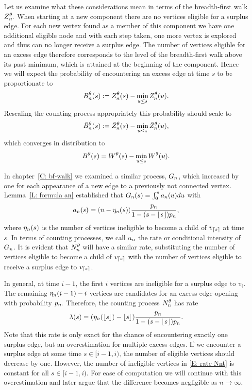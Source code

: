 Let us examine what these considerations mean in terms of the breadth-first walk $Z_n^{\theta}$.
When starting at a new component there are no vertices eligible for a surplus edge.
For each new vertex found as a member of this component we have one additional eligible node 
and with each step taken, one more vertex is explored and thus can no longer receive a surplus edge.
The number of vertices eligible for an excess edge therefore corresponds to the level of the breadth-first walk above its past minimum,
which is attained at the beginning of the component.
Hence we will expect the probability of encountering an excess edge at time $s$ to be proportionate to
\begin{equation} \label{D: zminz}
B_n^{\theta}(s) := Z_n^{\theta}(s) - \min_{u \leq s}Z_n^{\theta}(u).
\end{equation}
Rescaling the counting process appropriately this probability should scale to
\begin{equation}
\bar{B}_n^{\theta}(s) := \bar{Z}^{\theta}_n(s) - \min_{u \leq s}\bar{Z}^{\theta}_n(u),
\end{equation}
which converges in distribution to
\begin{equation*}
B^{\theta}(s) = W^{\theta}(s) - \min_{u \leq s}W^{\theta}(u). 
\end{equation*}

In chapter~\ref{C: bf-walk} we examined a similar process, $G_n$, 
which increased by one for each appearance of a new edge to a previously not connected vertex.
Lemma~\ref{L: formula an} established that $G_n(s) = \int_{0}^{s} a_n(u)du$ with
\begin{equation*}
	a_n(s) = (n - \eta_n(s)) \frac{p_n}{1-(s-\lfloor s\rfloor)p_n},
\end{equation*}
where $\eta_n(s)$ is the number of vertices ineligible to become a child of $v_{\lceil s\rceil}$ at time $s$.
In terms of counting processes, we call $a_n$ the rate or conditional intensity of $G_n$.
It is evident that $N_n^{\theta}$ will have a similar rate,
substituting the number of vertices eligible to become a child of $v_{\lceil s\rceil}$ with the number of vertices eligible to receive a surplus edge to $v_{\lceil s\rceil}$.

In general, at time $i-1$, the first $i$ vertices are ineligible for a surplus edge to $v_i$.
The remaining $\eta_n(i-1) - i$ vertices are candidates for an excess edge opening with probability $p_n$.
Therefore, the counting process $N_n^{\theta}$ has rate
\begin{equation} \label{E: rate Nnt}
\lambda(s) = (\eta_n(\lfloor s\rfloor) - \lfloor s\rfloor) \frac{p_n}{1-(s-\lfloor s\rfloor)p_n}.
\end{equation}
Note that this rate is only exact for the chance of encountering exactly one surplus edge, 
but an overestimation for multiple excess edges.
If we encounter a surplus edge at some time $s \in [i-1, i)$,
the number of eligible vertices should decrease by one.
However, the number of ineligible vertices in \eqref{E: rate Nnt} is constant for all $s \in [i-1, i)$.
For ease of computation we will continue with this overestimation and later argue that the difference becomes negligible as $n \rightarrow \infty$.

